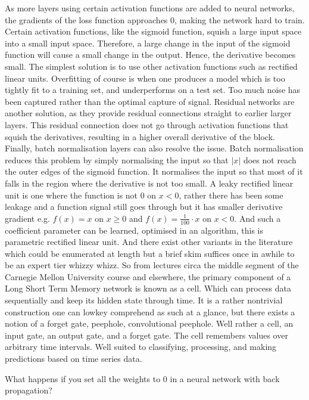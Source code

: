 As more layers using certain activation functions are added to neural networks, the gradients of the loss function approaches $0$, making the network hard to train. Certain activation functions, like the sigmoid function, squish a large input space into a small input space. Therefore, a large change in the input of the sigmoid function will cause a small change in the output. Hence, the derivative becomes small. The simplest solution is to use other activation functions such as rectified linear units. Overfitting of course is when one produces a model which is too tightly fit to a training set, and underperforms on a test set. Too much noise has been captured rather than the optimal capture of signal. Residual networks are another solution, as they provide residual connections straight to earlier larger layers. This residual connection does not go through activation functions that squish the derivatives, resulting in a higher overall derivative of the block. Finally, batch normalisation layers can also resolve the issue. Batch normalisation reduces this problem by simply normalising the input so that $|x|$ does not reach the outer edges of the sigmoid function. It normalises the input so that most of it falls in the region where the derivative is not too small. A leaky rectified linear unit is one where the function is not $0$ on $x<0$, rather there has been some leakage and a function signal still goes through but it has smaller derivative gradient e.g. $f(x) = x$ on $x \ge 0$ and $f(x) = \frac{1}{100} \cdot x$ on $x<0$. And such a coefficient parameter can be learned, optimised in an algorithm, this is parametric rectified linear unit. And there exist other variants in the literature which could be enumerated at length but a brief skim suffices once in awhile to be an expert tier whizzy whizz. So from lectures circa the middle segment of the Carnegie Mellon University course and elsewhere, the primary component of a Long Short Term Memory network is known as a cell. Which can process data sequentially and keep its hidden state through time. It is a rather nontrivial construction one can lowkey comprehend as such at a glance, but there exists a notion of a forget gate, peephole, convolutional peephole. Well rather a cell, an input gate, an output gate, and a forget gate. The cell remembers values over arbitrary time intervals. Well suited to classifying, processing, and making predictions based on time series data.

What happens if you set all the weights to 0 in a neural network with back propagation?

